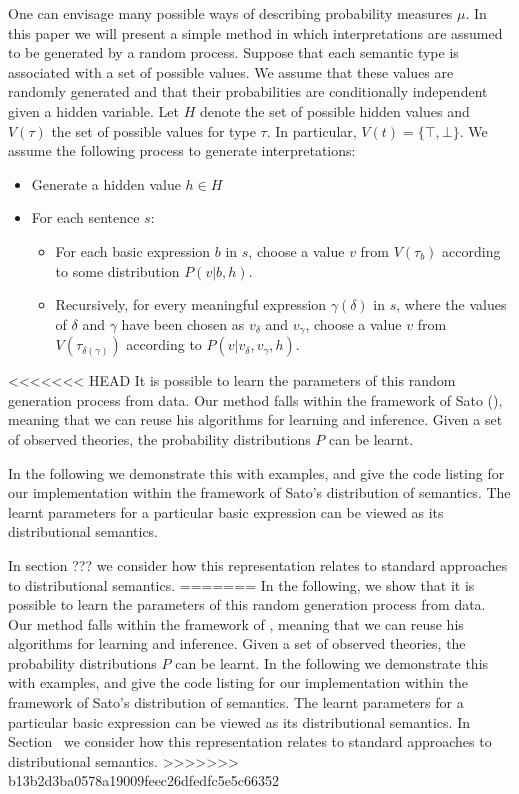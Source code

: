 \documentclass[letterpaper]{article}
\newcommand{\citet}[1]{\citeauthor{#1} \shortcite{#1}}
\begin{document}
One can envisage many possible ways of describing probability measures
$\mu$. In this paper we will present a simple method in which
interpretations are assumed to be generated by a random process. Suppose that each semantic type is associated with a set of possible values. 
We assume that these values are randomly generated and that their
probabilities are conditionally independent given a hidden
variable. Let $H$ denote the set of possible hidden values and $V(\tau)$  the
set of possible values for type $\tau$. In particular, $V(t) = \{\top, \bot\}$. We assume the following process to generate
interpretations:
\begin{itemize}
\item Generate a hidden value $h\in H$
\item For each sentence $s$:
\begin{itemize}
\item For each basic expression $b$ in $s$, choose a value $v$ from
  $V(\tau_b)$ according to some distribution $P(v|b,h)$.
\item Recursively, for every meaningful expression $\gamma(\delta)$ in
  $s$, where the values of $\delta$ and $\gamma$ have been chosen as
  $v_\delta$ and $v_\gamma$, choose a value $v$ from
  $V(\tau_{\delta(\gamma)})$ according to $P(v|v_\delta, v_\gamma,
  h)$.
\end{itemize}
\end{itemize}

<<<<<<< HEAD
It is possible to learn the parameters of this random
generation process from data.  Our method falls within the framework of
Sato (\citeyear{Sato:95}), meaning that we can reuse his algorithms
for learning and inference. Given a set of observed theories, the probability distributions $P$
can be learnt. 

In the following we demonstrate this with
examples, and give the code listing for our implementation within the framework of Sato's distribution of semantics. The learnt parameters for a particular basic
expression can be viewed as its distributional semantics. 

In section ??? we consider how this representation relates to standard
approaches to distributional semantics.
=======
In the following, we show that it is possible to learn the parameters
of this random generation process from data.  Our method falls within
the framework of \citet{Sato:95}, meaning that we can reuse his
algorithms for learning and inference.  Given a set of observed
theories, the probability distributions $P$ can be learnt. In the
following we demonstrate this with examples, and give the code listing
for our implementation within the framework of Sato's distribution of
semantics. The learnt parameters for a particular basic expression can
be viewed as its distributional semantics. In
Section~ we consider how this representation
relates to standard approaches to distributional semantics.
>>>>>>> b13b2d3ba0578a19009feec26dfedfc5e5c66352
\end{document}
